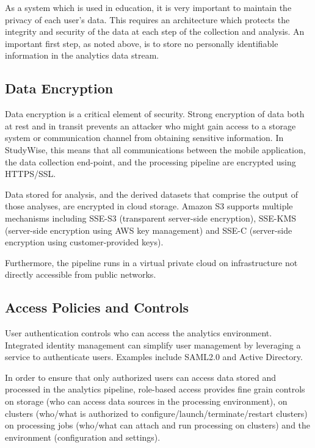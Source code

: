 \documentclass[runningheads,a4paper]{llncs}
\begin{document}
As a system which is used in education, it is very important to maintain the privacy of each user's data.  This requires an architecture which protects the integrity and security of the data at each step of the collection and analysis.  An important first step, as noted above, is to store no personally identifiable information in the analytics data stream.

\subsection{Data Encryption}

Data encryption is a critical element of security. Strong encryption of data both at rest and in transit prevents an attacker who might gain access to a storage system or communication channel from obtaining sensitive information.  In StudyWise, this means that all communications between the mobile application, the data collection end-point, and the processing pipeline are encrypted using HTTPS/SSL. 

Data stored for analysis, and the derived datasets that comprise the output of those analyses, are encrypted in cloud storage. Amazon S3 supports multiple mechanisms including SSE-S3 (transparent server-side encryption), SSE-KMS (server-side encryption using AWS key management) and SSE-C (server-side encryption using customer-provided keys).

Furthermore, the pipeline runs in a virtual private cloud on infrastructure not directly accessible from public networks.

\subsection{Access Policies and Controls}

User authentication controls who can access the analytics environment. Integrated identity management can simplify user management by leveraging a service to authenticate users.  Examples include SAML2.0 and Active Directory.  

In order to ensure that only authorized users can access data stored and processed in the analytics pipeline, role-based access provides fine grain controls on storage (who can access data sources in the processing environment), on clusters (who/what is authorized to configure/launch/terminate/restart clusters) on processing jobs (who/what can attach and run processing on clusters) and the environment (configuration and settings).
\end{document}
